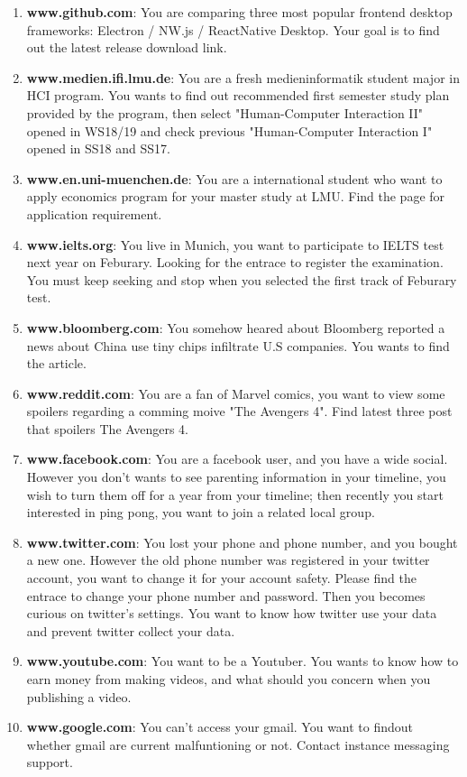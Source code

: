 \begin{enumerate}
\item \textbf{www.github.com}: You are comparing three most popular frontend desktop frameworks: Electron / NW.js / ReactNative Desktop. Your goal is to find out the latest release download link.
\item \textbf{www.medien.ifi.lmu.de}: You are a fresh medieninformatik student major in HCI program. You wants to find out recommended first semester study plan provided by the program, then select "Human-Computer Interaction II" opened in WS18/19 and check previous "Human-Computer Interaction I" opened in SS18 and SS17.
\item \textbf{www.en.uni-muenchen.de}: You are a international student who want to apply economics program  for your master study at LMU. Find the page for application requirement.
\item \textbf{www.ielts.org}: You live in Munich, you want to participate to IELTS test next year on Feburary. Looking for the entrace to register the examination. You must keep seeking and stop when you selected the first track of Feburary test.
\item \textbf{www.bloomberg.com}: You somehow heared about Bloomberg reported a news about China use tiny chips infiltrate U.S companies. You wants to find the article.
\item \textbf{www.reddit.com}: You are a fan of Marvel comics, you want to view some spoilers regarding a comming moive "The Avengers 4". Find latest three post that spoilers The Avengers 4.
\item \textbf{www.facebook.com}: You are a facebook user, and you have a wide social. However you don't wants to see parenting information in your timeline, you wish to turn them off for a year from your timeline; then recently you start interested in ping pong, you want to join a related local group.
\item \textbf{www.twitter.com}: You lost your phone and phone number, and you bought a new one. However the old phone number was registered in your twitter account, you want to change it for your account safety. Please find the entrace to change your phone number and password. Then you becomes curious on twitter's settings. You want to know how twitter use your data and prevent twitter collect your data.
\item \textbf{www.youtube.com}: You want to be a Youtuber. You wants to know how to earn money from making videos, and what should you concern when you publishing a video.
\item \textbf{www.google.com}: You can't access your gmail. You want to findout whether gmail are current malfuntioning or not. Contact instance messaging support.
\end{enumerate}

